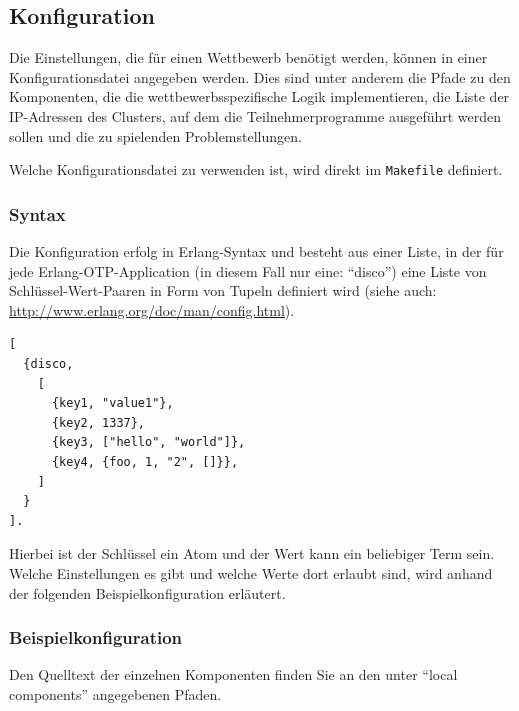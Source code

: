 \documentclass[a4paper, 12pt]{article}
\begin{document}
\subsection{Konfiguration}
\label{sec:configuration}

Die Einstellungen, die für einen Wettbewerb benötigt werden, können
in einer Konfigurationsdatei angegeben werden.
Dies sind unter anderem die Pfade zu den Komponenten, die die
wettbewerbsspezifische Logik implementieren, die Liste der IP-Adressen
des Clusters, auf dem die Teilnehmerprogramme ausgeführt werden sollen
und die zu spielenden Problemstellungen.

Welche Konfigurationsdatei zu verwenden ist, wird direkt im \texttt{Makefile}
definiert.

\subsubsection{Syntax}
Die Konfiguration erfolg in Erlang-Syntax und besteht aus einer Liste, in der
für jede Erlang-OTP-Application (in diesem Fall nur eine: ``disco'') eine
Liste von Schlüssel-Wert-Paaren in Form von Tupeln definiert wird (siehe auch:
\url{http://www.erlang.org/doc/man/config.html}).
\begin{lstlisting}
[
  {disco,
    [
      {key1, "value1"},
      {key2, 1337},
      {key3, ["hello", "world"]},
      {key4, {foo, 1, "2", []}},
    ]
  }
].
\end{lstlisting}
Hierbei ist der Schlüssel ein Atom und der Wert kann ein beliebiger Term
sein.
Welche Einstellungen es gibt und welche Werte dort erlaubt sind, wird anhand der
folgenden Beispielkonfiguration erläutert.

\subsubsection{Beispielkonfiguration}
\label{sec:configexample}

Den Quelltext der einzelnen Komponenten finden Sie an den unter
``local components'' angegebenen Pfaden.
\end{document}
